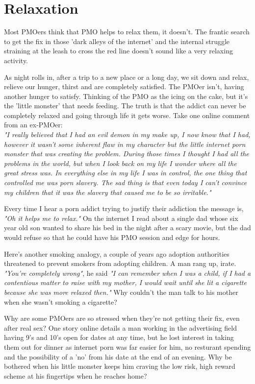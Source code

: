 \documentclass[easypeasy.tex]{subfiles}
\begin{document}
\section{Relaxation}

Most PMOers think that PMO helps to relax them, it doesn't. The frantic search to get the fix in those 'dark alleys of the internet' and the internal struggle straining at the leash to cross the red line doesn't sound like a very relaxing activity.

As night rolls in, after a trip to a new place or a long day, we sit down and relax, relieve our hunger, thirst and are completely satisfied. The PMOer isn't, having another hunger to satisfy. Thinking of the PMO as the icing on the cake, but it's the 'little monster' that needs feeding. The truth is that the addict can never be completely relaxed and going through life it gets worse. Take one online comment from an ex-PMOer:\\
  \textit{"I really believed that I had an evil demon in my make up, I now know that I had, however it wasn't some inherent flaw in my character but the little internet porn monster that was creating the problem. During those times I thought I had all the problems in the world, but when I look back on my life I wonder where all the great stress was. In everything else in my life I was in control, the one thing that controlled me was porn slavery. The sad thing is that even today I can't convince my children that it was the slavery that caused me to be so irritable."}

Every time I hear a porn addict trying to justify their addiction the message is, \textit{"Oh it helps me to relax."} On the internet I read about a single dad whose six year old son wanted to share his bed in the night after a scary movie, but the dad would refuse so that he could have his PMO session and edge for hours.

Here's another smoking analogy, a couple of years ago adoption authorities threatened to prevent smokers from adopting children. A man rang up, irate. \textit{"You're completely wrong"}, he said \textit{"I can remember when I was a child, if I had a contentious matter to raise with my mother, I would wait until she lit a cigarette because she was more relaxed then."} Why couldn't the man talk to his mother when she wasn't smoking a cigarette?

Why are some PMOers are so stressed when they're not getting their fix, even after real sex? One story online details a man working in the advertising field having 9's and 10's open for dates at any time, but he lost interest in taking them out for dinner as internet porn was far easier for him, no resturant spending and the possibility of a 'no' from his date at the end of an evening. Why be bothered when his little monster keeps him craving the low risk, high reward scheme at his fingertips when he reaches home?
\end{document}
